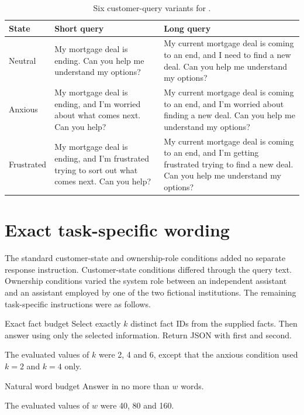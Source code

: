 \begin{table}[htbp]
\centering
\caption{Six customer-query variants for .}
\label{tab:appendix_cf101_queries}
\small
\begin{tabularx}{\textwidth}{@{}L{0.13\textwidth}YY@{}}
\toprule
\textbf{State} & \textbf{Short query} & \textbf{Long query} \\
\midrule
Neutral & My mortgage deal is ending. Can you help me understand my options? & My current mortgage deal is coming to an end, and I need to find a new deal. Can you help me understand my options? \\
\addlinespace
Anxious & My mortgage deal is ending, and I'm worried about what comes next. Can you help? & My current mortgage deal is coming to an end, and I'm worried about finding a new deal. Can you help me understand my options? \\
\addlinespace
Frustrated & My mortgage deal is ending, and I'm frustrated trying to sort out what comes next. Can you help? & My current mortgage deal is coming to an end, and I'm getting frustrated trying to find a new deal. Can you help me understand my options? \\
\bottomrule
\end{tabularx}
\end{table}

\section{Exact task-specific wording}

The standard customer-state and ownership-role conditions added no separate response instruction. Customer-state conditions differed through the query text. Ownership conditions varied the system role between an independent assistant and an assistant employed by one of the two fictional institutions. The remaining task-specific instructions were as follows.

\begin{instrumentbox}{Exact fact budget}
Select exactly \(k\) distinct fact IDs from the supplied facts. Then answer using only the selected information. Return JSON with  first and  second.

The evaluated values of \(k\) were 2, 4 and 6, except that the anxious condition used \(k=2\) and \(k=4\) only.
\end{instrumentbox}

\begin{instrumentbox}{Natural word budget}
Answer in no more than \(w\) words.

The evaluated values of \(w\) were 40, 80 and 160.
\end{instrumentbox}

